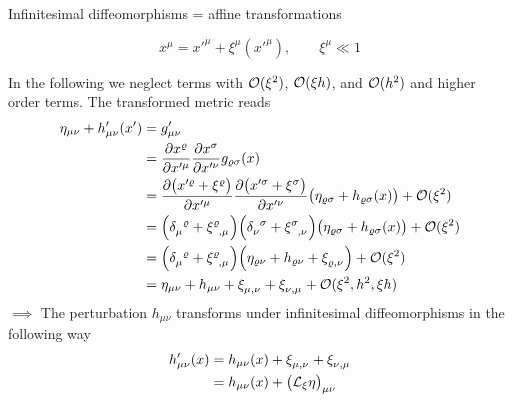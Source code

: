 Infinitesimal diffeomorphisms = affine transformations
\begin{definition}
    \begin{equation}
        x^\mu = x'^\mu + \xi^\mu(x'^\mu), \qquad \xi^\mu \ll 1
    \end{equation}
\end{definition}
In the following we neglect terms with $\mathcal{O}(\xi^2)$, $\mathcal{O}(\xi h)$, and $\mathcal{O}(h^2)$ and higher order terms.
The transformed metric reads
\begin{equation}
    \begin{split}
        \eta_{\mu\nu} + h'_{\mu\nu}(x') &= g'_{\mu\nu} \\
        &= \frac{\partial x^\varrho}{\partial x'^\mu} \frac{\partial x^\sigma}{\partial x'^\nu} g_{\varrho\sigma}(x) \\
        &= \frac{\partial \left( x'^\varrho + \xi^\varrho \right)}{\partial x'^\mu}
        \frac{\partial \left( x'^\sigma + \xi^\sigma \right)}{\partial x'^\nu}
        \left( \eta_{\varrho\sigma} + h_{\varrho\sigma}(x) \right) + \landauO(\xi^2) \\
        &= \left( \tensor{\delta}{_\mu^\varrho} + \tensor{\xi}{^\varrho_,_\mu} \right)
        \left( \tensor{\delta}{_\nu^\sigma} + \tensor{\xi}{^\sigma_,_\nu} \right)
        \left( \eta_{\varrho\sigma} + h_{\varrho\sigma}(x) \right) + \landauO(\xi^2) \\
        &= \left( \tensor{\delta}{_\mu^\varrho} + \tensor{\xi}{^\varrho_,_\mu} \right)
        \left( \eta_{\varrho\nu} + h_{\varrho\nu} + \tensor{\xi}{_\varrho_,_\nu} \right) + \landauO(\xi^2)  \\
        &= \eta_{\mu\nu} + h_{\mu\nu} + \tensor{\xi}{_\mu_,_\nu} + \tensor{\xi}{_\nu_,_\mu} + \landauO(\xi^2,h^2,\xi h)
    \end{split}
\end{equation}
$\implies$ The perturbation $h_{\mu\nu}$ transforms under infinitesimal diffeomorphisms in the following way
\begin{equation}
    \begin{split}
        h'_{\mu\nu}(x) &= h_{\mu\nu}(x) + \tensor{\xi}{_\mu_,_\nu} + \tensor{\xi}{_\nu_,_\mu} \\
        &= h_{\mu\nu}(x) + \left(\liedif{\xi}{\eta} \right)_{\mu\nu}
    \end{split}
\end{equation}
